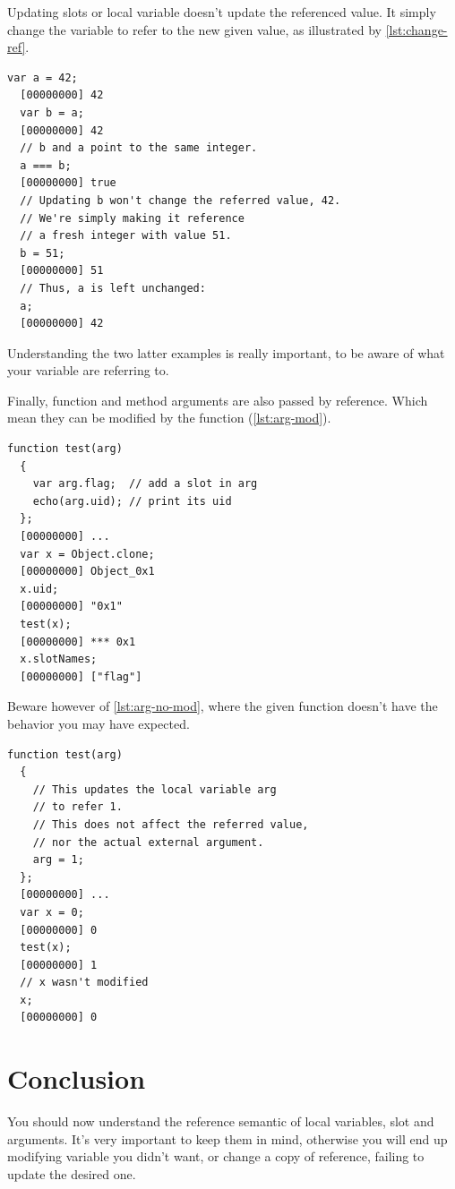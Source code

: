 \documentclass[openright,twoside,12pt]{report}
\newcommand{\lst}[1]{\autoref{lst:#1}}
\begin{document}
Updating slots or local variable doesn't update the referenced
value. It simply change the variable to refer to the new given value,
as illustrated by \lst{change-ref}.

\begin{lstlisting}[caption=Updates just change the referee,
  label=lst:change-ref]
  var a = 42;
  [00000000] 42
  var b = a;
  [00000000] 42
  // b and a point to the same integer.
  a === b;
  [00000000] true
  // Updating b won't change the referred value, 42.
  // We're simply making it reference
  // a fresh integer with value 51.
  b = 51;
  [00000000] 51
  // Thus, a is left unchanged:
  a;
  [00000000] 42
\end{lstlisting}

Understanding the two latter examples is really important, to be aware
of what your variable are referring to.

Finally, function and method arguments are also passed by
reference. Which mean they can be modified by the function
(\lst{arg-mod}).

\begin{lstlisting}[caption=Function modifying its argument,
  label=lst:arg-mod]
  function test(arg)
  {
    var arg.flag;  // add a slot in arg
    echo(arg.uid); // print its uid
  };
  [00000000] ...
  var x = Object.clone;
  [00000000] Object_0x1
  x.uid;
  [00000000] "0x1"
  test(x);
  [00000000] *** 0x1
  x.slotNames;
  [00000000] ["flag"]
\end{lstlisting}

Beware however of \lst{arg-no-mod}, where the given function doesn't
have the behavior you may have expected.

\begin{lstlisting}[caption=Function failing to modify its argument,
  label=lst:arg-no-mod]
  function test(arg)
  {
    // This updates the local variable arg
    // to refer 1.
    // This does not affect the referred value,
    // nor the actual external argument.
    arg = 1;
  };
  [00000000] ...
  var x = 0;
  [00000000] 0
  test(x);
  [00000000] 1
  // x wasn't modified
  x;
  [00000000] 0
\end{lstlisting}

\section{Conclusion}

You should now understand the reference semantic of local variables,
slot and arguments. It's very important to keep them in mind,
otherwise you will end up modifying variable you didn't want, or
change a copy of reference, failing to update the desired one.
\end{document}
